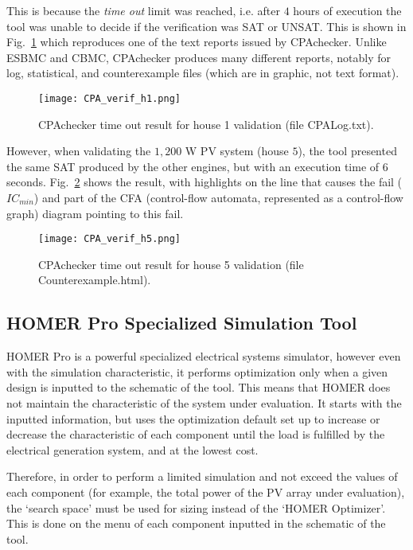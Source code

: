 This is because the \textit{time out} limit was reached, i.e. after $4$ hours of execution the tool was unable to decide if the verification was SAT or UNSAT. This is shown in Fig.~\ref{fig:cpavalidh1} which reproduces one of the text reports issued by CPAchecker. Unlike ESBMC and CBMC, CPAchecker produces many different reports, notably for log, statistical, and counterexample files (which are in graphic, not text format).

\begin{figure}[h]
\texttt{[image: CPA\_verif\_h1.png]}
\centering
\caption{CPAchecker time out result for house 1 validation (file CPALog.txt).}
\label{fig:cpavalidh1}
\end{figure}

However, when validating the $1,200$ W PV system (house $5$), the tool presented the same SAT produced by the other engines, but with an execution time of $6$ seconds. Fig.~\ref{fig:cpavalidh5} shows the result, with highlights on the line that causes the fail ($IC_{min}$) and part of the CFA (control-flow automata, represented as a control-flow graph) diagram pointing to this fail.

\begin{figure}[h]
\texttt{[image: CPA\_verif\_h5.png]}
\centering
\caption{CPAchecker time out result for house 5 validation (file Counterexample.html).}
\label{fig:cpavalidh5}
\end{figure}


\subsection{HOMER Pro Specialized Simulation Tool}
\label{sec:homerenviron}

HOMER Pro is a powerful specialized electrical systems simulator, however even with the simulation characteristic, it performs optimization only when a given design is inputted to the schematic of the tool. This means that HOMER does not maintain the characteristic of the system under evaluation. It starts with the inputted information, but uses the optimization default set up to increase or decrease the characteristic of each component until the load is fulfilled by the electrical generation system, and at the lowest cost. 

Therefore, in order to perform a limited simulation and not exceed the values of each component (for example, the total power of the PV array under evaluation), the `search space' must be used for sizing instead of the `HOMER Optimizer'. This is done on the menu of each component inputted in the schematic of the tool. 

